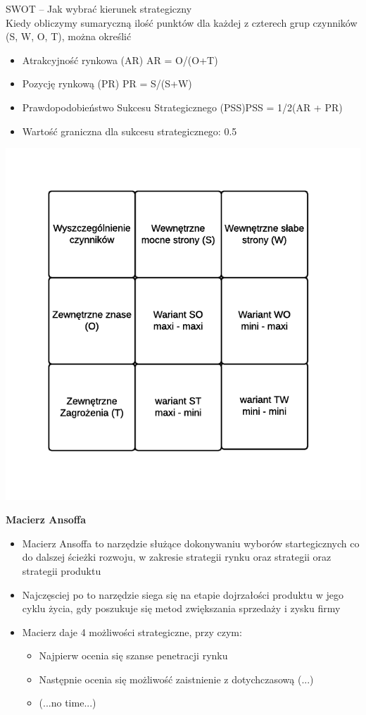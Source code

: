 \documentclass[a4paper,10pt]{report}
\begin{document}
SWOT -- Jak wybrać kierunek strategiczny\\
Kiedy obliczymy sumaryczną ilość punktów dla każdej z czterech grup czynników (S, W, O, T), można określić

\begin{itemize}
	\item Atrakcyjność rynkowa (AR) AR = O/(O+T)
	\item Pozycję rynkową (PR) PR = S/(S+W)
	\item Prawdopodobieństwo Sukcesu Strategicznego (PSS)PSS = 1/2(AR + PR)
	\item Wartość graniczna dla sukcesu strategicznego: 0.5
\end{itemize}

\begin{center}
\includegraphics[scale=1]{assets/SWOT3}
\end{center}

\textbf{Macierz Ansoffa}
\begin{itemize}
	\item Macierz Ansoffa to narzędzie służące dokonywaniu wyborów startegicznych co do dalszej ścieżki rozwoju, w zakresie strategii rynku oraz strategii oraz strategii produktu
	\item Najczęsciej po to narzędzie siega się na etapie dojrzałości produktu w jego cyklu życia, gdy poszukuje się metod zwiększania sprzedaży i zysku firmy
	\item Macierz daje 4 możliwości strategiczne, przy czym:
	\begin{itemize}
		\item Najpierw ocenia się szanse penetracji rynku
		\item Następnie ocenia się możliwość zaistnienie z dotychczasową (...) 
		\item (...no time...)
	\end{itemize}
\end{itemize}
\end{document}
